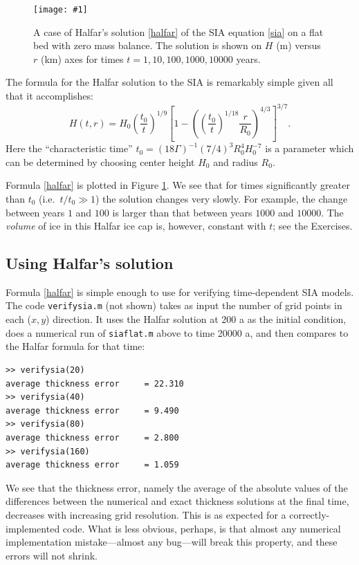 \documentclass[letterpaper,final,12pt,reqno]{amsart}
\newcommand{\onefigsize}[3]{
\begin{figure}[ht]
\centering
\texttt{[image: \#1]}
\caption{#2}
\label{fig:#1}
\end{figure}}
\begin{document}
\onefigsize{siascaling}{A case of Halfar's solution \eqref{halfar} of the SIA equation \eqref{sia} on a flat bed with zero mass balance.  The solution is shown on $H$ (m) versus $r$ (km) axes for times $t=1,10,100,1000,10000$ years.}{5.5in}

The formula for the Halfar solution to the SIA is remarkably simple given all that it accomplishes:
\begin{equation}
H(t,r) = H_0 \left(\frac{t_0}{t}\right)^{1/9} \left[1 - \left(\left(\frac{t_0}{t}\right)^{1/18} \frac{r}{R_0}\right)^{4/3}\right]^{3/7}. \label{halfar}
\end{equation}
Here the ``characteristic time'' $t_0 = (18 \Gamma)^{-1} (7/4)^3 R_0^4 H_0^{-7}$ is a parameter which can be determined by choosing center height $H_0$ and radius $R_0$.

Formula \eqref{halfar} is plotted in Figure \ref{fig:siascaling}.  We see that for times significantly greater than $t_0$ (i.e.~$t/t_0 \gg 1$) the solution changes very slowly.  For example, the change between years $1$ and $100$ is larger than that between years $1000$ and $10000$.  The \emph{volume} of ice in this Halfar ice cap is, however, constant with $t$; see the Exercises.

\subsection*{Using Halfar's solution}  Formula \eqref{halfar} is simple enough to use for verifying time-dependent SIA models.  The code \texttt{verifysia.m} (not shown) takes as input the number of grid points in each ($x,y$) direction.  It uses the Halfar solution at 200 a as the initial condition, does a numerical run of \texttt{siaflat.m} above to time 20000 a, and then compares to the Halfar formula for that time:
\small
\begin{verbatim}
>> verifysia(20)
average thickness error     = 22.310
>> verifysia(40)
average thickness error     = 9.490
>> verifysia(80)
average thickness error     = 2.800
>> verifysia(160)
average thickness error     = 1.059
\end{verbatim}
\normalsize
We see that the thickness error, namely the average of the absolute values of the differences between the numerical and exact thickness solutions at the final time, decreases with increasing grid resolution.  This is as expected for a correctly-implemented code.  What is less obvious, perhaps, is that almost any numerical implementation mistake---almost any bug---will break this property, and these errors will not shrink.
\end{document}
